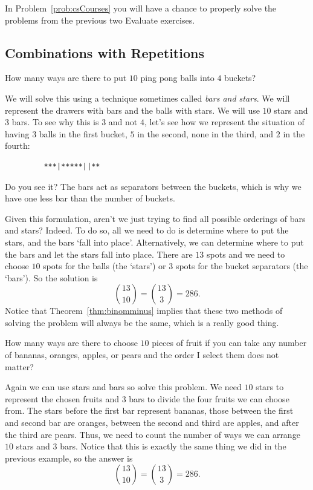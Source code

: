 In Problem~\ref{prob:csCourses} you will have a chance to properly 
solve the problems from the previous two Evaluate exercises.

\subsection{Combinations with Repetitions}

\begin{exa}
How many ways are there to put $10$ ping pong balls into $4$ buckets?
\begin{sol}
We will solve this using a technique sometimes called {\em bars and stars}.
We will represent the drawers with bars and the balls with stars.  We will use
$10$ stars and $3$ bars.  To see why this is $3$ and not $4$, let's see how we 
represent the situation of having $3$ balls in the first bucket, $5$ in the second,
none in the third, and $2$ in the fourth:
\begin{verbatim}
         ***|*****||**
\end{verbatim}
Do you see it?  The bars act as separators between the buckets, which is why we
have one less bar than the number of buckets.

Given this formulation, aren't we just trying to find all possible orderings of
bars and stars?  Indeed.  To do so, all we need to do is determine where to put the
stars, and the bars `fall into place'.  Alternatively, we can determine where to
put the bars and let the stars fall into place.  
There are $13$ spots and we need to choose $10$ spots for the balls (the `stars')
or $3$ spots for the bucket separators (the `bars').
So the solution is 
$$\binom{13}{10}=\binom{13}{3}=286.$$
Notice that Theorem~\ref{thm:binomminus} implies that these two methods
of solving the problem will always be the same, which is a really good thing.
\end{sol}
\end{exa}

\begin{exa}
How many ways are there to choose $10$ pieces of fruit if you can take any number
of bananas, oranges, apples, or pears and the order I select them does not matter?
\begin{sol}
Again we can use stars and bars so solve this problem.  We need $10$ stars to represent
the chosen fruits and $3$ bars to divide the four fruits we can choose from.
The stars before the first bar represent bananas, those between the first and second
bar are oranges, between the second and third are apples, and after the third are pears.
Thus, we need to count the number of ways we can arrange $10$ stars and $3$ bars.
Notice that this is exactly the same thing we did in the previous example, so the
answer is 
$$\binom{13}{10}=\binom{13}{3}=286.$$
\end{sol}
\end{exa}

